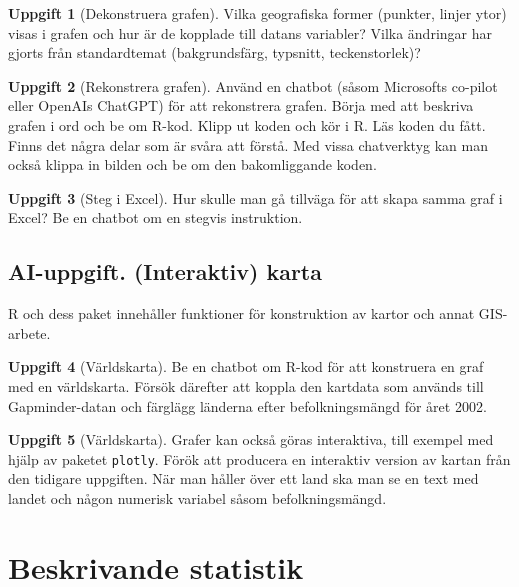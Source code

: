 \documentclass[
]{book}
\theoremstyle{definition}
\theoremstyle{definition}
\theoremstyle{definition}
\newtheorem{exercise}{Uppgift}[chapter]
\theoremstyle{definition}
\theoremstyle{remark}
\begin{document}
\begin{exercise}[Dekonstruera grafen]
Vilka geografiska former (punkter, linjer ytor) visas i grafen och hur är de kopplade till datans variabler? Vilka ändringar har gjorts från standardtemat (bakgrundsfärg, typsnitt, teckenstorlek)?
\end{exercise}

\begin{exercise}[Rekonstrera grafen]
Använd en chatbot (såsom Microsofts co-pilot eller OpenAIs ChatGPT) för att rekonstrera grafen. Börja med att beskriva grafen i ord och be om R-kod. Klipp ut koden och kör i R. Läs koden du fått. Finns det några delar som är svåra att förstå. Med vissa chatverktyg kan man också klippa in bilden och be om den bakomliggande koden.
\end{exercise}

\begin{exercise}[Steg i Excel]
Hur skulle man gå tillväga för att skapa samma graf i Excel? Be en chatbot om en stegvis instruktion.
\end{exercise}

\section{AI-uppgift. (Interaktiv) karta}\label{ai-uppgift.-interaktiv-karta}

R och dess paket innehåller funktioner för konstruktion av kartor och annat GIS-arbete.

\begin{exercise}[Världskarta]
Be en chatbot om R-kod för att konstruera en graf med en världskarta. Försök därefter att koppla den kartdata som används till Gapminder-datan och färglägg länderna efter befolkningsmängd för året 2002.
\end{exercise}

\begin{exercise}[Världskarta]
Grafer kan också göras interaktiva, till exempel med hjälp av paketet \texttt{plotly}. Förök att producera en interaktiv version av kartan från den tidigare uppgiften. När man håller över ett land ska man se en text med landet och någon numerisk variabel såsom befolkningsmängd.
\end{exercise}

\chapter{Beskrivande statistik}\label{beskrivande-statistik}
\end{document}
